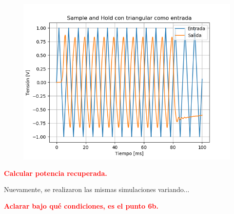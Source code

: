 \begin{multicols}{2}
\begin{figure}[H]
\end{figure}
\begin{figure}[H]
	\centering
	\includegraphics[width=\linewidth]{ImagenesEjercicio6/SH - Tri.png}
\end{figure}
\end{multicols}

\textcolor{red}{\textbf{Calcular potencia recuperada.}}

Nuevamente, se realizaron las mismas simulaciones variando...

\textcolor{red}{\textbf{Aclarar bajo qué condiciones, es el punto 6b.}}

